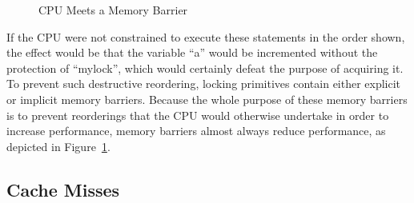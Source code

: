 \begin{figure}[tb]
\begin{center}
\end{center}
\caption{CPU Meets a Memory Barrier}
\label{fig:cpu:CPU Meets a Memory Barrier}
\end{figure}

If the CPU were not constrained to execute these statements in the
order shown, the effect would be that the variable ``a'' would be
incremented without the protection of ``mylock'', which would certainly
defeat the purpose of acquiring it.
To prevent such destructive reordering, locking primitives contain
either explicit or implicit memory barriers.
Because the whole purpose of these memory barriers is to prevent reorderings
that the CPU would otherwise undertake in order to increase performance,
memory barriers almost always reduce performance, as depicted in
Figure~\ref{fig:cpu:CPU Meets a Memory Barrier}.

\subsection{Cache Misses}
\label{sec:cpu:Cache Misses}

